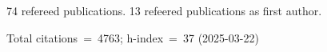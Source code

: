 74 refereed publications. 13 refeered publications as first author.

Total citations~=~4763; h-index~=~37 (2025-03-22)